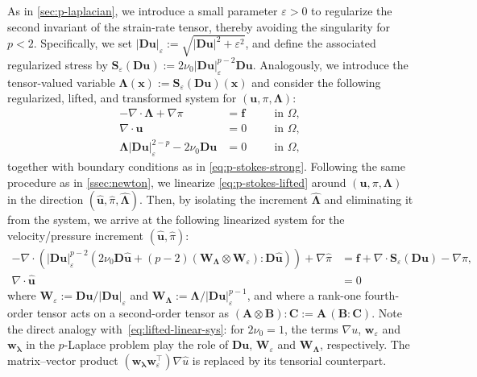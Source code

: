 \documentclass[11pt,pdflatex,sn-mathphys-num]{sn-jnl}
\theoremstyle{thmstyleone}%
\theoremstyle{thmstyletwo}%
\theoremstyle{thmstylethree}%
\newcommand{\bs}[1]{\ensuremath{\boldsymbol{#1}}}
\begin{document}
As in \cref{sec:p-laplacian}, we introduce a small parameter $\varepsilon>0$ to regularize the second invariant of the strain-rate tensor, thereby avoiding the singularity for $p<2$. Specifically, we set
$|\bs{D}\bs{u}|_\varepsilon := \sqrt{|\bs{D}\bs{u}|^2+\varepsilon^2}$, and define the associated regularized stress by $\bs{S}_\varepsilon(\bs{D}\bs{u}) := 2\nu_0|\bs{D}\bs{u}|_\varepsilon^{p-2}\bs{D}\bs{u}$. Analogously, we introduce the tensor-valued variable $\bs{\Lambda}(\bs{x}) := \bs{S}_\varepsilon(\bs{D}\bs{u})(\bs{x})$ and consider the following regularized, lifted, and transformed system for $(\bs{u}, \pi, \bs{\Lambda})$:
\begin{subequations}
\label{eq:p-stokes-lifted}
\begin{alignat}{2}
-\nabla\!\cdot\!\bs{\Lambda} + \nabla\pi
   &= \bs{f}         \quad   && \text{in }\Omega,
   \label{eq:p-stokes-lifted-mom}\\
\nabla\!\cdot\!\bs{u}
   &= 0                 && \text{in }\Omega,
   \label{eq:p-stokes-lifted-mass}\\
   \bs{\Lambda} |\bs{D}\bs{u}|_\varepsilon^{2-p} - 2\nu_0\bs{D}\bs{u} &= 0 && \text{in }\Omega,
\end{alignat}
\end{subequations}
together with boundary conditions as in \eqref{eq:p-stokes-strong}.
Following the same procedure as in \cref{ssec:newton}, we linearize \eqref{eq:p-stokes-lifted} around $(\bs{u}, \pi, \bs{\Lambda})$ in the direction $(\bs{\hat{u}}, \hat{\pi}, \bs{\hat{\Lambda}})$. Then, by isolating the increment $\bs{\hat{\Lambda}}$ and eliminating it from the system, we arrive at the following linearized system for the velocity/pressure increment $(\bs{\hat u}, \hat\pi)$:
\begin{subequations} \label{eq:p-stokes-tangent}
\begin{alignat}{1}
\label{eq:p-stokes-tangent1}
- \nabla\cdot \left( |\bs{D}\bs{u}|_\varepsilon^{p-2}\! \left(2\nu_0\bs{D}\bs{\hat{u}} \!+\! (p\!-\!2) \left({\bs{W}_{\!\bs\Lambda}} \otimes \bs{W}_{\!\varepsilon} \right):\bs{D}\hat{\bs{u}}\right) \right) + \nabla\hat{\pi} &= \bs{f} + \nabla\!\cdot\!\bs{S}_\varepsilon\!\left(\bs{D}{\bs{u}}\right) \!-\! \nabla\pi,\\
\nabla \cdot \hat {\bs u} &= 0\label{eq:p-stokes-tangent2}
\end{alignat}
\end{subequations}
where $\bs{W}_{\!\varepsilon} := \bs{D}\bs{u}/|\bs{D}\bs{u}|_\varepsilon$ and ${\bs{W}}_{\!\bs\Lambda} := \bs{\Lambda}/|\bs{D}\bs{u}|_\varepsilon^{p-1}$, and where a rank-one fourth-order tensor acts on a second-order tensor as $(\bs A\otimes\bs B):\bs C := \bs A\,(\bs B\!:\!\bs C)$.
Note the direct analogy
with~\eqref{eq:lifted-linear-sys}: for $2\nu_0 = 1$, the terms $\nabla u$, $\bs w_\varepsilon$ and $\bs w_{\bs\lambda}$ in the $p$-Laplace problem play the role of $\bs{D}\bs{u}$, $\bs{W}_{\!\varepsilon}$ and $\bs{W}_{\!\bs\Lambda}$, respectively. The matrix--vector product $(\bs w_{\bs\lambda}\bs w_\varepsilon^\top)\nabla\hat u$ is replaced by its tensorial counterpart.
\end{document}
